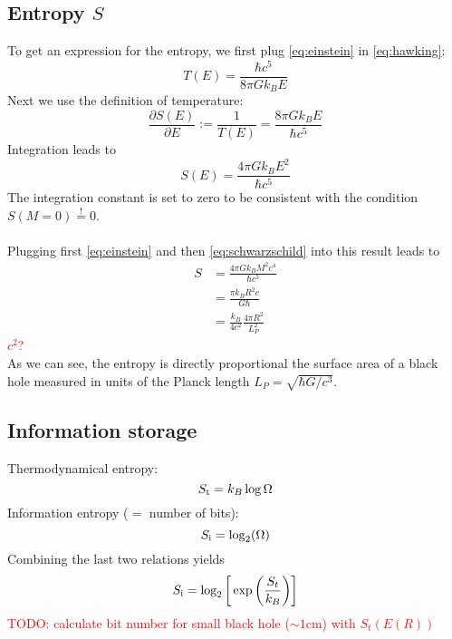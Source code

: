 \subsection{Entropy $S$}
To get an expression for the entropy, we first plug 
\autoref{eq:einstein} in \autoref{eq:hawking}:
\begin{equation}
    T(E)=\frac{\hbar c^5}{8\pi Gk_BE}
\end{equation}
Next we use the definition of temperature:
\begin{equation}
    \frac{\partial S(E)}{\partial E}:=\frac{1}{T(E)}
    =\frac{8\pi Gk_BE}{\hbar c^5}
\end{equation}
Integration leads to
\begin{equation}
    S(E)=\frac{4\pi Gk_BE^2}{\hbar c^5}
\end{equation}
The integration constant is set to zero to be consistent with 
the condition $S(M=0)\overset{!}{=}0$. \\
\\
Plugging first \autoref{eq:einstein} and then \autoref{eq:schwarzschild} into 
this result leads to
\begin{align}
    S
    &=\frac{4\pi Gk_BM^2c^4}{\hbar c^5} \\
    &=\frac{\pi k_BR^2c}{G\hbar} \\
    &=\frac{k_B}{4c^2}\frac{4\pi R^2}{L_P^2}
\end{align}
\textcolor{red}{$c^2$?} \\
As we can see, the entropy is directly proportional the surface area of a 
black hole measured in units of the Planck length $L_P=\sqrt{\hbar G/c^3}$.

\subsection{Information storage}
Thermodynamical entropy:
\begin{equation}
    S_\textnormal{t}=k_B\log{\Omega}
    \label{}
\end{equation}
Information entropy ($=$ number of bits):
\begin{equation}
    S_\textnormal{i}=\log_2(\Omega)
\end{equation}
Combining the last two relations yields
\begin{equation}
    S_\textnormal{i}=\log_2\bigg[\exp\bigg(\frac{S_t}{k_B}\bigg)\bigg]
\end{equation}
\textcolor{red}{
    TODO: calculate bit number for small black hole ($\sim1$cm) with $S_t(E(R))$
}

